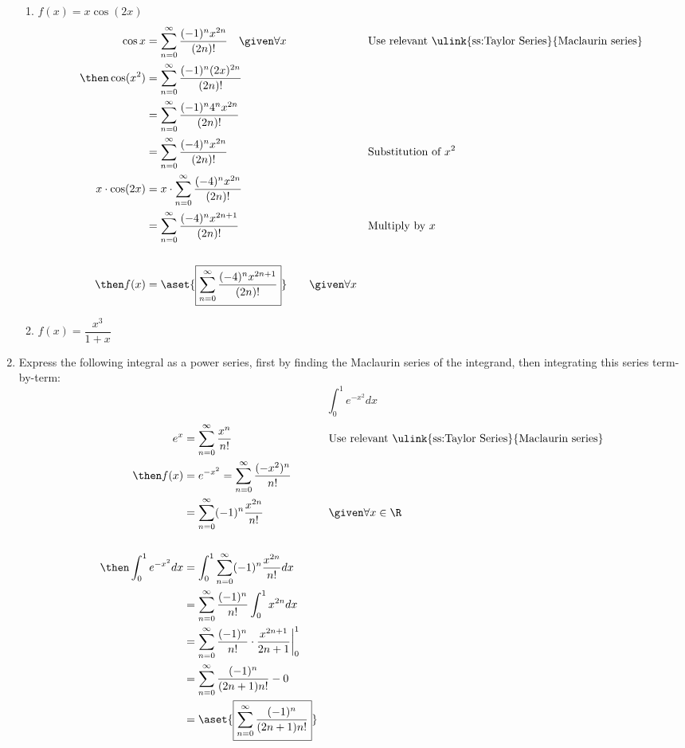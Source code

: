 \begin{enumerate}
    \begin{enumerate}[itemsep=24em]
      \item \(f(x) = x \cos (2x)\)
        \begin{align*}
          \cos x &= \sum_{n=0}^{\infty} \frac{(-1)^nx^{2n} }{(2n)!} \quad \given \forall x
                 && \text{Use relevant \ulink{ss:Taylor Series}{Maclaurin series}} \\
          \then \cos(x^2) &= \sum_{n=0}^{\infty} \frac{(-1)^n(2x)^{2n} }{(2n)!} \\
                          &= \sum_{n=0}^{\infty} \frac{(-1)^n 4^n x^{2n} }{(2n)!} \\
                          &= \sum_{n=0}^{\infty} \frac{(-4)^n x^{2n} }{(2n)!}
                          && \text{Substitution of}~x^2 \\
          x \cdot \cos (2x) &= x \cdot \sum_{n=0}^{\infty} \frac{(-4)^nx^{2n} }{(2n)!} \\
                            &= \sum_{n=0}^{\infty} \frac{(-4)^n x^{2n+1} }{(2n)!}
                            && \text{Multiply by } x\\
                            \\
          \then f(x) &= \aset{\boxed{\sum_{n=0}^{\infty} \frac{(-4)^nx^{2n+1} }{(2n)!}}}
          \qquad \given \forall x
        \end{align*}

      \vspace{-22em}
      \item \(f(x) = \dfrac{x^3}{1+x}\)
    \end{enumerate}

\newpage %

  \item Express the following integral as a power series, first by finding the
    Maclaurin series of the integrand, then integrating this series
    term-by-term:
    \[%
    \int_{0}^{1} e^{-x^2}  dx
    \]%
    \begin{align*}
      e^x &= \sum_{n=0}^{\infty} \frac{x^n}{n!}
      && \text{Use relevant \ulink{ss:Taylor Series}{Maclaurin series}} \\
      \then f(x) &= e^{-x^2} =  \sum_{n=0}^{\infty} \frac{(-x^2)^n}{n!}  \\
                 &= \sum_{n=0}^{\infty} (-1)^n \frac{x^{2n}}{n!}
                 && \given \forall x \in \R\\
      \\
      \then \int_{0}^{1} e^{-x^2}  dx
       &= \int_{0}^{1} \sum_{n=0}^{\infty} (-1)^n \frac{x^{2n}}{n!} dx \\
       &= \sum_{n=0}^{\infty} \frac{(-1)^n}{n!} \int_{0}^{1} x^{2n} dx \\
       &= \sum_{n=0}^{\infty} \frac{(-1)^n}{n!} \cdot \frac{x^{2n+1}}{2n+1} \bigg|_{0}^{1} \\
       &= \sum_{n=0}^{\infty} \frac{(-1)^n}{(2n+1)n!}
       - 0 \\
       &= \aset{\boxed{\sum_{n=0}^{\infty} \frac{(-1)^n}{(2n+1)n!}}}
    \end{align*}


\end{enumerate}
